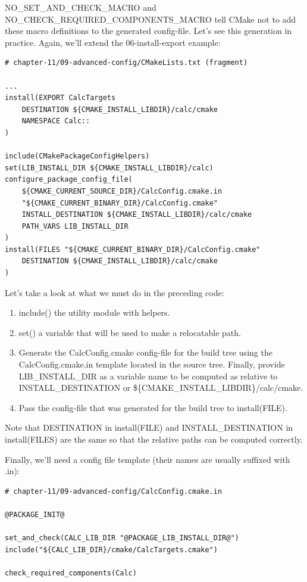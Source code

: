 NO\_SET\_AND\_CHECK\_MACRO and NO\_CHECK\_REQUIRED\_COMPONENTS\_MACRO tell CMake not to add these macro definitions to the generated config-file. Let's see this generation in practice. Again, we'll extend the 06-install-export example:

\begin{lstlisting}[style=styleCMake]
# chapter-11/09-advanced-config/CMakeLists.txt (fragment)

...
install(EXPORT CalcTargets
	DESTINATION ${CMAKE_INSTALL_LIBDIR}/calc/cmake
	NAMESPACE Calc::
)

include(CMakePackageConfigHelpers)
set(LIB_INSTALL_DIR ${CMAKE_INSTALL_LIBDIR}/calc)
configure_package_config_file(
	${CMAKE_CURRENT_SOURCE_DIR}/CalcConfig.cmake.in
	"${CMAKE_CURRENT_BINARY_DIR}/CalcConfig.cmake"
	INSTALL_DESTINATION ${CMAKE_INSTALL_LIBDIR}/calc/cmake
	PATH_VARS LIB_INSTALL_DIR
)
install(FILES "${CMAKE_CURRENT_BINARY_DIR}/CalcConfig.cmake"
	DESTINATION ${CMAKE_INSTALL_LIBDIR}/calc/cmake
)
\end{lstlisting}

Let's take a look at what we must do in the preceding code:

\begin{enumerate}
\item 
include() the utility module with helpers.

\item 
set() a variable that will be used to make a relocatable path.

\item 
Generate the CalcConfig.cmake config-file for the build tree using the CalcConfig.cmake.in template located in the source tree. Finally, provide LIB\_INSTALL\_DIR as a variable name to be computed as relative to INSTALL\_DESTINATION or \$\{CMAKE\_INSTALL\_LIBDIR\}/calc/cmake.

\item 
Pass the config-file that was generated for the build tree to install(FILE).
\end{enumerate}

Note that DESTINATION in install(FILE) and INSTALL\_DESTINATION in install(FILES) are the same so that the relative paths can be computed correctly.

Finally, we'll need a config file template (their names are usually suffixed with .in):

\begin{lstlisting}[style=styleCMake]
# chapter-11/09-advanced-config/CalcConfig.cmake.in

@PACKAGE_INIT@

set_and_check(CALC_LIB_DIR "@PACKAGE_LIB_INSTALL_DIR@")
include("${CALC_LIB_DIR}/cmake/CalcTargets.cmake")

check_required_components(Calc)
\end{lstlisting}

